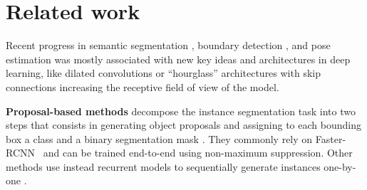 
\section{Related work} \label{sec:related_work}
Recent progress in semantic segmentation \cite{long2015fully,kong2018recurrent,chen2018deeplab}, boundary detection \cite{arbelaez2011contour,xie2015holistically,maninis2018convolutional}, %
and pose estimation \cite{wei2016convolutional,cao2017realtime} was mostly associated with new key ideas and architectures in deep learning, like dilated convolutions \cite{yu2015multi,chen2018deeplab} or ``hourglass'' architectures with skip connections \cite{ronneberger2015u,paszke2016enet} increasing the receptive field of view of the model.

\textbf{Proposal-based methods} decompose the instance segmentation task into two steps that consists in generating object proposals and assigning to each bounding box a class and a binary segmentation mask \cite{he2017mask,yang2012layered,li2017fully,ladicky2010and,hariharan2014simultaneous,chen2015multi,dai2016instance,liang2016reversible}. 
They commonly rely on {Faster-RCNN}~\cite{ren2015faster} and can be trained end-to-end using non-maximum suppression. Other methods use instead recurrent models to sequentially generate instances one-by-one \cite{romera2016recurrent,ren2017end}.

